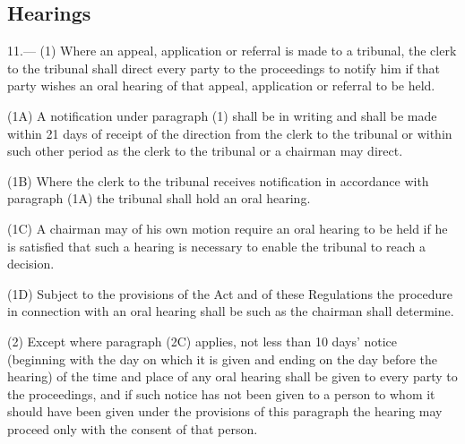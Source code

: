 \documentclass[12pt,a4paper]{article}
\begin{document}
\subsection[11. Hearings]{Hearings}

11.—%
%
(1) Where an 
appeal, application or referral  %
is made to a tribunal, the clerk to the tribunal shall direct every party to the proceedings to notify him if that party wishes an oral hearing of that 
appeal, application or referral  %
to be held.

(1A) A notification under paragraph (1) shall be in writing and shall be made within 21 days of receipt of the direction from the clerk to the tribunal or within such other period as the clerk to the tribunal or a chairman may direct.

(1B) Where the clerk to the tribunal receives notification in accordance with paragraph (1A) the tribunal shall hold an oral hearing.

(1C) A chairman may of his own motion require an oral hearing to be held if he is satisfied that such a hearing is necessary to enable the tribunal to reach a decision.

(1D) Subject to the provisions of the Act and of these Regulations the procedure in connection with an oral hearing shall be such as the chairman shall determine.

(2) 
Except where paragraph (2C) applies,  %
not less than 10 days' notice (beginning with the day on which it is given and ending on the day before the hearing) of 
the time and place of any oral hearing  %
shall be given to every party to the proceedings, and if such notice has not been given to a person to whom it should have been given under the provisions of this paragraph the hearing may proceed only with the consent of that person.
\end{document}
